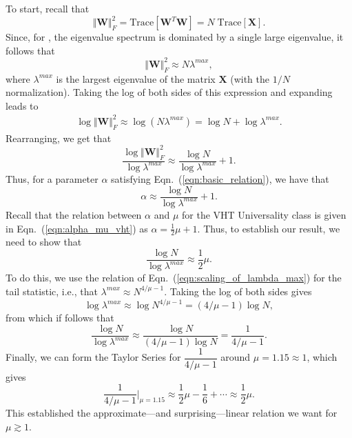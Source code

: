 {
To start, recall that 
$$ 
\Vert \mathbf{W}\Vert_{F}^{2}=\mbox{Trace}[\mathbf{W}^{T}\mathbf{W}]=N\;\mbox{Trace}[\mathbf{X}]  .
$$
Since, for ,  
the eigenvalue spectrum is dominated by a single large eigenvalue, it follows that
$$
\Vert \mathbf{W}\Vert_{F}^{2}\approx N\lambda^{max}  , 
$$
where $\lambda^{max}$ is the largest eigenvalue of the matrix $\mathbf{X}$ (with the $1/N$ normalization).
Taking the log of both sides of this expression and expanding leads to
\begin{eqnarray*}
\log\Vert \mathbf{W}\Vert_{F}^{2} 
   \approx \log \left( N\lambda^{max} \right) 
   =       \log N+\log\lambda^{max}  .
\end{eqnarray*}
Rearranging, we get that 
$$
\dfrac{\log\Vert \mathbf{W}\Vert_{F}^{2}}{\log\lambda^{max}}\approx \dfrac{\log N}{\log\lambda^{max}}+1  .
$$
Thus, for a parameter $\alpha$ satisfying Eqn.~(\ref{eqn:basic_relation}), we have that 
$$
\alpha\approx \dfrac{\log N}{\log\lambda^{max}}+1  .
$$
Recall that the relation between $\alpha$ and $\mu$ for the VHT Universality class is given in Eqn.~(\ref{eqn:alpha_mu_vht}) as
$ %
\alpha=\frac{1}{2}\mu+1  .
$ %
Thus, to establish our result, we need to show that
$$
\dfrac{\log N}{\log\lambda^{max}}\approx\dfrac{1}{2}\mu  .
$$
To do this, we use the relation of Eqn.~(\ref{eqn:scaling_of_lambda_max}) for the tail statistic, i.e., that 
$ %
\lambda^{max}\approx N^{4/\mu-1}  .
$ %
Taking the log of both sides gives
$$
\log\lambda^{max}\approx\log N^{4/\mu-1}=(4/\mu-1)\log N  ,
$$
from which if follows that
$$
\dfrac{\log N}{\log\lambda^{max}}\approx\dfrac{\log N}{(4/\mu-1)\log N}=\dfrac{1}{4/\mu-1}   .
$$
Finally, we can form the Taylor Series for $\dfrac{1}{4/\mu-1}$ around $\mu=1.15\approx 1$, which gives 
$$
\dfrac{1}{4/\mu-1}\bigg\rvert_{\mu=1.15}\approx\dfrac{1}{2}\mu-\dfrac{1}{6}+\cdots\approx\dfrac{1}{2}\mu  .
$$
This established the approximate---and surprising---linear relation we want for $\mu \gtrsim 1$. 



}
